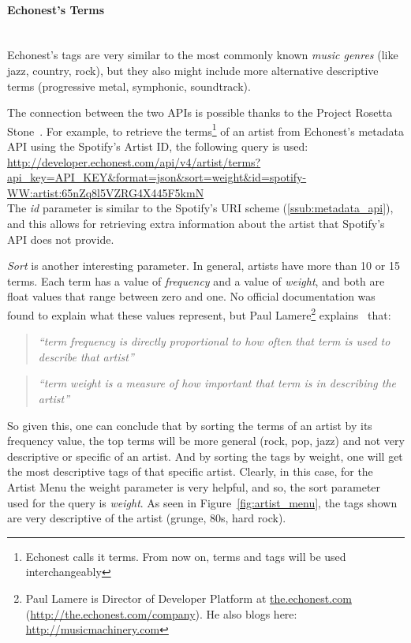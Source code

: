       \paragraph{Echonest's Terms} \hfill \\
      Echonest's tags are very similar to the most commonly known \emph{music genres} (like jazz, country, rock), but they also might include more alternative descriptive terms (progressive metal, symphonic, soundtrack).

      The connection between the two APIs is possible thanks to the Project Rosetta Stone~\cite{rosettastone}.
      For example, to retrieve the terms\footnote{Echonest calls it terms. From now on, terms and tags will be used interchangeably} of an artist from Echonest's metadata API using the Spotify's Artist ID, the following query is used: \\

      \url{
        http://developer.echonest.com/api/v4/artist/terms?api_key=API_KEY&format=json&sort=weight&id=spotify-WW:artist:65nZq8l5VZRG4X445F5kmN
      } \\

      The \emph{id} parameter is similar to the Spotify's URI scheme (\ref{ssub:metadata_api}), and this allows for retrieving extra information about the artist that Spotify's API does not provide.

      \emph{Sort} is another interesting parameter. 
      In general, artists have more than 10 or 15 terms.
      Each term has a value of \emph{frequency} and a value of \emph{weight}, and both are float values that range between zero and one.
      No official documentation was found to explain what these values represent, but Paul Lamere\footnote{Paul Lamere is Director of Developer Platform at \url{the.echonest.com} (\url{http://the.echonest.com/company}). He also blogs here: \url{http://musicmachinery.com}} explains~\cite{lamereterms} that:

      \begin{quote}
      \emph{
        ``term frequency is directly proportional to how often that term is used to describe that artist''
      }
      \end{quote}

      \begin{quote}
      \emph{
        ``term weight is a measure of how important that term is in describing the artist''
      }
      \end{quote}

      So given this, one can conclude that by sorting the terms of an artist by its frequency value, the top terms will be more general (rock, pop, jazz) and not very descriptive or specific of an artist.
      And by sorting the tags by weight, one will get the most descriptive tags of that specific artist.
      Clearly, in this case, for the Artist Menu the weight parameter is very helpful, and so, the sort parameter used for the query is \emph{weight}.
      As seen in Figure~\ref{fig:artist_menu}, the tags shown are very descriptive of the artist (grunge, 80s, hard rock).

